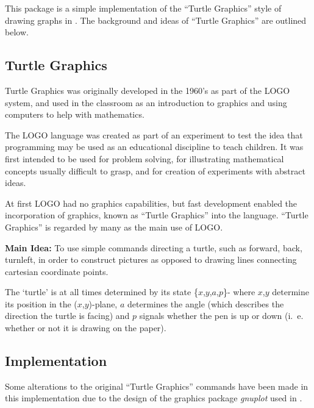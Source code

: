 
\newcommand{\turtlesyntax}[1]{\textsl{SYNTAX: } \texttt{#1}}
\newcommand{\turtleabb}[1]{\textsl{Abbreviated form: } \texttt{#1}}

This package is a simple implementation of the ``Turtle Graphics''
style of drawing graphs in {\REDUCE}. The background and ideas of
``Turtle Graphics'' are outlined below.

\subsection{Turtle Graphics}

Turtle Graphics was originally developed in the 1960's as part of the
LOGO system, and used in the classroom as an introduction to graphics
and using computers to help with mathematics.

The LOGO language was created as part of an experiment to test the idea
that programming may be used as an educational discipline to teach children.
It was first intended to be used for problem solving, for illustrating
mathematical concepts usually difficult to grasp, and for creation of
experiments with abstract ideas.

At first LOGO had no graphics capabilities, but fast development enabled
the incorporation of graphics, known as ``Turtle Graphics'' into the
language. ``Turtle Graphics'' is regarded by many as the main use of
LOGO.


\textbf{Main Idea: } To use simple commands directing a turtle, such as
forward, back, turnleft, in order to construct pictures as opposed to
drawing lines connecting cartesian coordinate points.

The `turtle' is at all times determined by its state \{$x$,$y$,$a$,$p$\}-
where $x$,$y$ determine its position in the \mbox{($x$,$y$)-plane}, $a$
determines the angle (which describes the direction the turtle is
facing) and $p$ signals whether the pen is up or down (i.~e.~  whether or
not it is drawing on the paper).


\subsection{Implementation}
Some alterations to the original ``Turtle Graphics'' commands have been
made in this implementation due to the design of the graphics package
\emph{gnuplot} used in {\REDUCE}.

